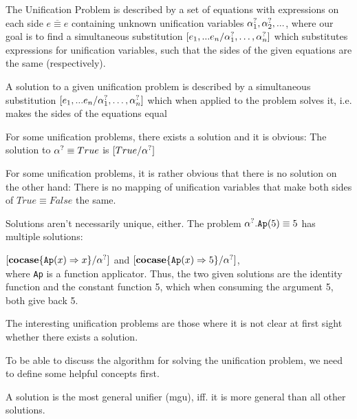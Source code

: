 \documentclass[twoside,12pt,a4paper]{article}
\begin{document}
The Unification Problem is described by a set of equations with expressions on each side $\overline{e\equiv e}$ containing unknown unification variables $\alpha^?_1, \alpha^?_2, ...$, %
where our goal is to find a simultaneous substitution $[e_1,...e_n / \alpha^?_1, \dots, \alpha^?_n]$ which substitutes expressions for unification variables, 
such that the sides of the given equations are the same (respectively). 

\begin{definition}[Solution]
    A solution to a given unification problem is described by a simultaneous substitution $[e_1,...e_n / \alpha^?_1, \dots, \alpha^?_n]$
    which when applied to the problem solves it, i.e. makes the sides of the equations equal %
\end{definition}

For some unification problems, there exists a solution and it is obvious:
The solution to $\alpha^? \equiv True$ is $[True/\alpha^?]$

For some unification problems, it is rather obvious that there is no solution on the other hand:
There is no mapping of unification variables that make both sides of $True \equiv False$ the same.

Solutions aren't necessarily unique, either. The problem $\alpha^?.\texttt{Ap}(5) \equiv 5$ has multiple solutions: 

$[\textbf{cocase}\{\texttt{Ap}(x)\Rightarrow x\} / \alpha^?]$ and $[\textbf{cocase}\{\texttt{Ap}(x)\Rightarrow 5\} / \alpha^?]$,\\
where \texttt{Ap} is a function applicator. 
Thus, the two given solutions are the identity function and the constant function 5, which when consuming the argument 5, both give back 5.

The interesting unification problems are those where it is not clear at first sight whether there exists a solution.

To be able to discuss the algorithm for solving the unification problem, we need to define some helpful concepts first.
    
\begin{definition}
    A solution is the most general unifier (mgu), iff. it is more general than all other solutions.
\end{definition} 
\end{document}
